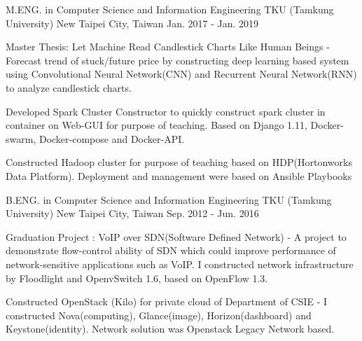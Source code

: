 

\begin{cventries}

    \cventry
        {M.ENG. in Computer Science and Information Engineering}
        {TKU (Tamkung University)}
        {New Taipei City, Taiwan}
        {Jan. 2017 - Jan. 2019}
        {
            \begin{cvitems}
                \item 
                    {
                        Master Thesis: Let Machine Read Candlestick Charts Like Human Beings - Forecast trend of stuck/future price by constructing deep learning based system using Convolutional Neural Network(CNN) and Recurrent Neural Network(RNN) to analyze candlestick charts.
                    }
                \item
                    {
                        Developed Spark Cluster Constructor to quickly construct spark cluster in container on Web-GUI for purpose of teaching. Based on Django 1.11, Docker-swarm, Docker-compose and Docker-API.
                    }
                \item
                    {
                        Constructed Hadoop cluster for purpose of teaching based on HDP(Hortonworks Data Platform). Deployment and management were based on Ansible Playbooks
                    }
            \end{cvitems}
        }

    \cventry
        {B.ENG. in Computer Science and Information Engineering}
        {TKU (Tamkung University)}
        {New Taipei City, Taiwan}
        {Sep. 2012 - Jun. 2016}
        {
            \begin{cvitems}
                \item 
                    {
                        Graduation Project : VoIP over SDN(Software Defined Network) - A project to demonstrate flow-control ability of SDN which could improve performance of network-sensitive applications such as VoIP. I constructed network infrastructure by Floodlight and OpenvSwitch 1.6, based on OpenFlow 1.3.
                    }
                \item
                    {
                        Constructed OpenStack (Kilo) for private cloud of Department of CSIE - I constructed Nova(computing), Glance(image), Horizon(dashboard) and Keystone(identity). Network solution was Openstack Legacy Network based.
                    }
            \end{cvitems}
        }
    


\end{cventries}
